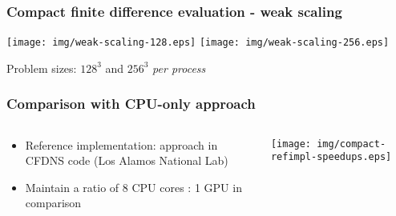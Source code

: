\begin{frame}
\frametitle{Compact finite difference evaluation - weak scaling}
\centering
\texttt{[image: img/weak-scaling-128.eps]}
\texttt{[image: img/weak-scaling-256.eps]}

Problem sizes: $128^3$ and $256^3$ \emph{per process}
\end{frame}

\begin{frame}
\frametitle{Comparison with CPU-only approach}
\begin{columns}
\begin{column}{0.5\textwidth}
\begin{itemize}
\item Reference implementation: approach in CFDNS code
    (Los Alamos National Lab)
\item Maintain a ratio of 8 CPU cores : 1 GPU in comparison
\end{itemize}
\end{column}
\begin{column}{0.5\textwidth}
\centering
\begin{table}
\resizebox{0.75\textwidth}{!}{%

}
\end{table}

\texttt{[image: img/compact-refimpl-speedups.eps]}
\end{column}
\end{columns}
\end{frame}
